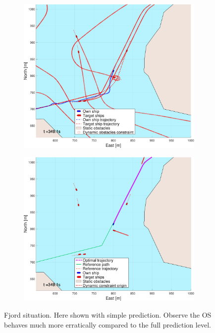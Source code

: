 \begin{figure}[ht!]
\begin{subfigure}[b]{0.494\textwidth}
        \subcaption{}
    \end{subfigure}
    \hfill
    \\ 
    \begin{subfigure}[b]{0.494\textwidth}
        \centering
        \includegraphics[width=\textwidth]{Images/NewFigures/Trheimfjord/_Simple_1fig1_time=350}
        \subcaption{}
    \end{subfigure}
    \hfill
    \begin{subfigure}[b]{0.494\textwidth}
        \centering
        \includegraphics[width=\textwidth]{Images/NewFigures/Trheimfjord/_Simple_1fig999_time=350}
        \subcaption{}
    \end{subfigure}
    \hfill
    \caption{Fjord situation. Here shown with simple prediction. Observe the \gls{OS} behaves much more erratically compared to the full prediction level.}

\end{figure}


